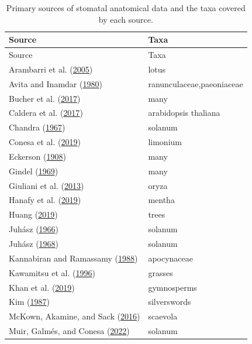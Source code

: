 \documentclass[
  12pt,
]{article}
\begin{document}
\begin{longtable}[]{@{}ll@{}}
\caption{\label{tab:sources}Primary sources of stomatal anatomical data and the taxa covered by each source.}\tabularnewline
\toprule()
Source & Taxa \\
\midrule()
\endfirsthead
\toprule()
Source & Taxa \\
\midrule()
\endhead
Arambarri et al. (\protect\hyperlink{ref-arambarri_taxonomy_2005}{2005}) & lotus \\
Avita and Inamdar (\protect\hyperlink{ref-avita_structure_1980}{1980}) & ranunculaceae,paeoniaceae \\
Bucher et al. (\protect\hyperlink{ref-bucher_stomatal_2017}{2017}) & many \\
Caldera et al. (\protect\hyperlink{ref-caldera_effects_2017}{2017}) & arabidopsis thaliana \\
Chandra (\protect\hyperlink{ref-chandra_epidermal_1967}{1967}) & solanum \\
Conesa et al. (\protect\hyperlink{ref-conesa_stomatal_2019}{2019}) & limonium \\
Eckerson (\protect\hyperlink{ref-eckerson_number_1908}{1908}) & many \\
Gindel (\protect\hyperlink{ref-gindel_stomatal_1969}{1969}) & many \\
Giuliani et al. (\protect\hyperlink{ref-giuliani_coordination_2013}{2013}) & oryza \\
Hanafy et al. (\protect\hyperlink{ref-hanafy_leaf_2019}{2019}) & mentha \\
Huang (\protect\hyperlink{ref-huang_leaf_2019}{2019}) & trees \\
Juhász (\protect\hyperlink{ref-juhasz_effect_1966}{1966}) & solanum \\
Juhász (\protect\hyperlink{ref-juhasz_comparative_1968}{1968}) & solanum \\
Kannabiran and Ramassamy (\protect\hyperlink{ref-kannabiran_foliar_1988}{1988}) & apocynaceae \\
Kawamitsu et al. (\protect\hyperlink{ref-kawamitsu_stomatal_1996}{1996}) & grasses \\
Khan et al. (\protect\hyperlink{ref-khan_taxonomic_2019}{2019}) & gymnosperms \\
Kim (\protect\hyperlink{ref-kim_comparative_1987}{1987}) & silverswords \\
McKown, Akamine, and Sack (\protect\hyperlink{ref-mckown_trait_2016}{2016}) & scaevola \\
Muir, Galmés, and Conesa (\protect\hyperlink{ref-muir_unpublished_2022}{2022}) & solanum \\

\end{longtable}
\end{document}

